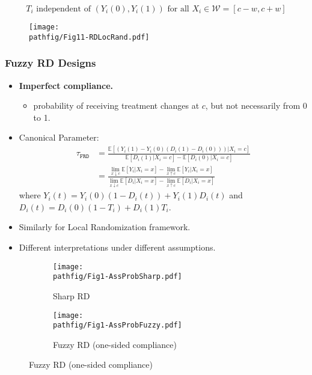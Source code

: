 \documentclass[9pt]{beamer}
\newcommand{\E}{\mathbb{E}}
\renewcommand{\c}{c}
\newcommand{\W}{\mathcal{W}}
\newcommand{\pathfig}{figures}
\begin{document}
\begin{frame}
	\[ T_i \text{ independent of } (Y_i(0),Y_i(1)) \text{ for all } X_i\in\W=[\c-w,c+w] \]
	\begin{figure}
		\vspace{-0.1in}
		\centering
		\texttt{[image: \\pathfig/Fig11-RDLocRand.pdf]}
	\end{figure}
\end{frame}

\begin{frame}\frametitle{Fuzzy RD Designs}
	\begin{itemize}
		\item \textbf{Imperfect compliance.}\medskip 
		\begin{itemize}
			\item probability of receiving treatment changes at $\c$, but not necessarily from 0 to 1.\bigskip
		\end{itemize}
		
		\item Canonical Parameter:
		\begin{align*}
			\tau_{\mathtt{FRD}}
			&=\frac{\E[(Y_{i}(1)-Y_{i}(0)(D_{i}(1)-D_{i}(0)))|X_{i}=\c]}{\E[D_{i}(1)|X_{i}=\c]-\E[D_{i}(0)|X_{i}=\c]}\\
			&=\frac{\lim_{x\downarrow\c}\E[Y_i|X_i=x]-\lim_{x\uparrow\c}\E[Y_i|X_i=x]}{\lim_{x\downarrow\c}\E[D_i|X_i=x]-\lim_{x\uparrow\c}\E[D_i|X_i=x]}
		\end{align*}
		where $Y_{i}(t) = Y_{i}(0)(1-D_{i}(t)) + Y_{i}(1)D_{i}(t)$ and $D_{i}(t) = D_{i}(0)(1-T_{i}) + D_{i}(1)T_{i}$.\bigskip
		
		\item Similarly for Local Randomization framework.\bigskip
		
		\item Different interpretations under different assumptions.\bigskip
	\end{itemize}
\end{frame}

\begin{frame}
	\begin{figure}[h]
		\begin{subfigure}[t]{0.47\textwidth}
			\centering
			\texttt{[image: \\pathfig/Fig1-AssProbSharp.pdf]}
			\caption{Sharp RD}       
		\end{subfigure}
		\hspace{0.1in}
		\begin{subfigure}[t]{0.47\textwidth}
			\centering
			\texttt{[image: \\pathfig/Fig1-AssProbFuzzy.pdf]}
			\caption{Fuzzy RD (one-sided compliance)}
		\end{subfigure}
	\end{figure}
\end{frame}
\end{document}
